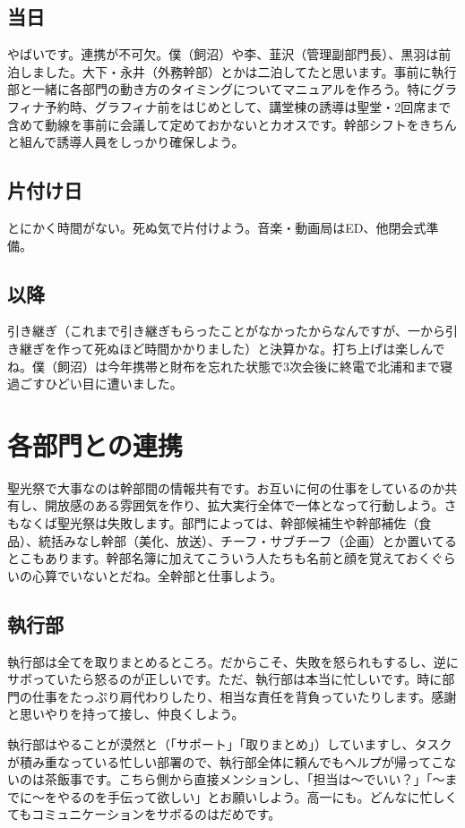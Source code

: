 \documentclass[dvipdfmx,jb5]{jarticle}
\begin{document}
\subsection{当日}
やばいです。連携が不可欠。僕（飼沼）や李、韮沢（管理副部門長）、黒羽は前泊しました。大下・永井（外務幹部）とかは二泊してたと思います。事前に執行部と一緒に各部門の動き方のタイミングについてマニュアルを作ろう。特にグラフィナ予約時、グラフィナ前をはじめとして、講堂棟の誘導は聖堂・2回席まで含めて動線を事前に会議して定めておかないとカオスです。幹部シフトをきちんと組んで誘導人員をしっかり確保しよう。

\subsection{片付け日}
とにかく時間がない。死ぬ気で片付けよう。音楽・動画局はED、他閉会式準備。

\subsection{以降}
引き継ぎ（これまで引き継ぎもらったことがなかったからなんですが、一から引き継ぎを作って死ぬほど時間かかりました）と決算かな。打ち上げは楽しんでね。僕（飼沼）は今年携帯と財布を忘れた状態で3次会後に終電で北浦和まで寝過ごすひどい目に遭いました。

\section{各部門との連携}
聖光祭で大事なのは幹部間の情報共有です。お互いに何の仕事をしているのか共有し、開放感のある雰囲気を作り、拡大実行全体で一体となって行動しよう。さもなくば聖光祭は失敗します。部門によっては、幹部候補生や幹部補佐（食品）、統括みなし幹部（美化、放送）、チーフ・サブチーフ（企画）とか置いてるとこもあります。幹部名簿に加えてこういう人たちも名前と顔を覚えておくぐらいの心算でいないとだね。全幹部と仕事しよう。

\subsection{執行部}
執行部は全てを取りまとめるところ。だからこそ、失敗を怒られもするし、逆にサボっていたら怒るのが正しいです。ただ、執行部は本当に忙しいです。時に部門の仕事をたっぷり肩代わりしたり、相当な責任を背負っていたりします。感謝と思いやりを持って接し、仲良くしよう。

執行部はやることが漠然と（「サポート」「取りまとめ」）していますし、タスクが積み重なっている忙しい部署ので、執行部全体に頼んでもヘルプが帰ってこないのは茶飯事です。こちら側から直接メンションし、「担当は〜でいい？」「〜までに〜をやるのを手伝って欲しい」とお願いしよう。高一にも。どんなに忙しくてもコミュニケーションをサボるのはだめです。
\end{document}

